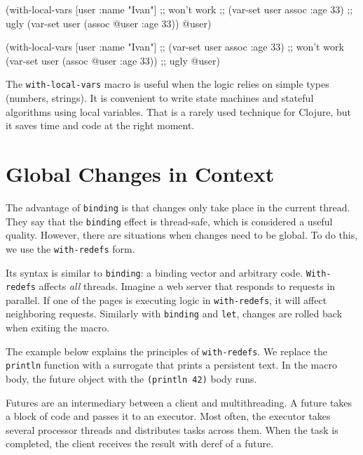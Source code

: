 \ifx\DEVICETYPE\MOBILE

\begin{clojure}
(with-local-vars [user {:name "Ivan"}]
  ;; won't work
  ;; (var-set user assoc :age 33)
  ;; ugly
  (var-set user (assoc @user :age 33))
  @user)
\end{clojure}

\else

\begin{clojure}
(with-local-vars [user {:name "Ivan"}]
  ;; (var-set user assoc :age 33) ;; won't work
  (var-set user (assoc @user :age 33)) ;; ugly
  @user)
\end{clojure}

\fi

The \verb|with-local-vars| macro is useful when the logic relies on simple types (numbers, strings).
It is convenient to write state machines and stateful algorithms using local variables.
That is a rarely used technique for Clojure, but it saves time and code at the right moment.

\section{Global Changes in Context}


\label{with-redefs}

The advantage of \verb|binding| is that changes only take place in the current thread.
They say that the \verb|binding| effect is thread-safe, which is considered a useful quality.
However, there are situations when changes need to be global.
To do this, we use the \verb|with-redefs| form.

\noindent
Its syntax is similar to \verb|binding|: a binding vector and arbitrary code. \verb|With-redefs| affects \emph{all} threads.
Imagine a web server that responds to requests in parallel.
If one of the pages is executing logic in \verb|with-redefs|, it will affect neighboring requests.
Similarly with \verb|binding| and \verb|let|, changes are rolled back when exiting the macro.

The example below explains the principles of \texttt{with\--redefs}.
We replace the \verb|println| function with a surrogate that prints a persistent text.
In the macro body, the future object with the \verb|(println 42)| body runs.


Futures are an intermediary between a client and multithreading.
A future takes a block of code and passes it to an executor.
Most often, the executor takes several processor threads and distributes tasks across them.
When the task is completed, the client receives the result with deref of a future.

